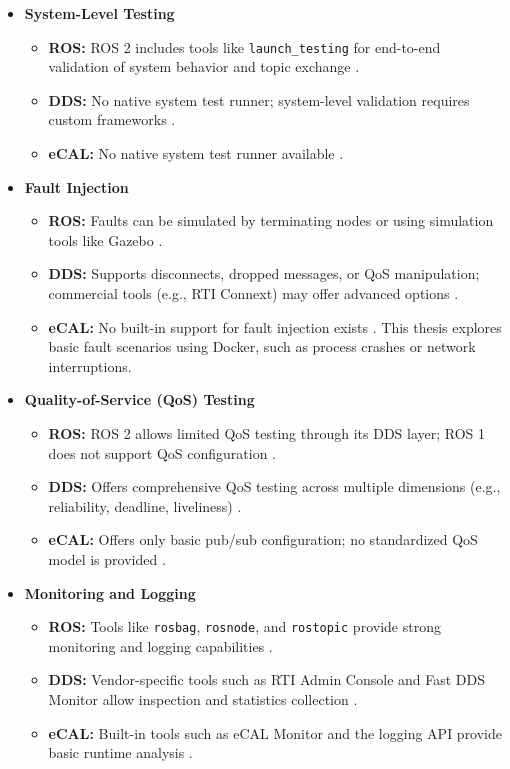 {\begin{itemize}
	\item \textbf{System-Level Testing}
	\begin{itemize}
		\item \textbf{ROS:} ROS 2 includes tools like \texttt{launch\_testing} for end-to-end validation of system behavior and topic exchange \cite{ros2_launch_testing}.
		\item \textbf{DDS:} No native system test runner; system-level validation requires custom frameworks \cite{rti_connext_dds}.
		\item \textbf{eCAL:} No native system test runner available \cite{ecal_official_docs}.
	\end{itemize}
	
	\item \textbf{Fault Injection}
	\begin{itemize}
		\item \textbf{ROS:} Faults can be simulated by terminating nodes or using simulation tools like Gazebo \cite{quigley2009}.
		\item \textbf{DDS:} Supports disconnects, dropped messages, or QoS manipulation; commercial tools (e.g., RTI Connext) may offer advanced options \cite{rti_connext_dds}.
		\item \textbf{eCAL:} No built-in support for fault injection exists \cite{ecal_official_docs}. This thesis explores basic fault scenarios using Docker, such as process crashes or network interruptions.
	\end{itemize}
	
	\newpage
	\item \textbf{Quality-of-Service (QoS) Testing}
	\begin{itemize}
		\item \textbf{ROS:} ROS 2 allows limited QoS testing through its DDS layer; ROS 1 does not support QoS configuration \cite{ros2_launch_testing}.
		\item \textbf{DDS:} Offers comprehensive QoS testing across multiple dimensions (e.g., reliability, deadline, liveliness) \cite{pardo2003}.
		\item \textbf{eCAL:} Offers only basic pub/sub configuration; no standardized QoS model is provided \cite{ecal_official_docs}.
	\end{itemize}
	
	\item \textbf{Monitoring and Logging}
	\begin{itemize}
		\item \textbf{ROS:} Tools like \texttt{rosbag}, \texttt{rosnode}, and \texttt{rostopic} provide strong monitoring and logging capabilities \cite{quigley2009}.
		\item \textbf{DDS:} Vendor-specific tools such as RTI Admin Console and Fast DDS Monitor allow inspection and statistics collection \cite{rti_connext_dds, eprosima_fast_dds}.
		\item \textbf{eCAL:} Built-in tools such as eCAL Monitor and the logging API provide basic runtime analysis \cite{ecal_official_docs}.
	\end{itemize}
	

\end{itemize}}
